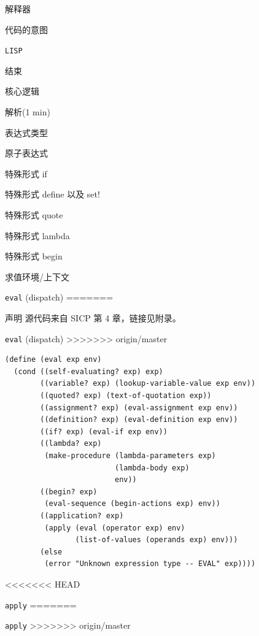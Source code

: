 \documentclass[presentation, bigger]{beamer}
\begin{document}
\begin{frame}[label={sec:org106539d},fragile]{解释器}
\begin{frame}[label={sec:org3020c49},fragile]{代码的意图}
\begin{frame}[label={sec:org3aa0441},fragile]{\texttt{LISP}}
\begin{frame}[label={sec:orgae54002}]{结束}
\begin{frame}[label={sec:orgdceac76}]{核心逻辑}
\begin{frame}[label={sec:org629dbc5},fragile]{解析(1 min)}
\begin{frame}[label={sec:org4dc3947}]{表达式类型}
\begin{frame}[label={sec:org0820679},fragile]{原子表达式}
\begin{frame}[label={sec:org7f2d161},fragile]{特殊形式 \alert{if}}
\begin{frame}[label={sec:org068cbf5},fragile]{特殊形式 \alert{define} 以及 \alert{set!}}
\begin{frame}[label={sec:org112cef9},fragile]{特殊形式 \alert{quote}}
\begin{frame}[label={sec:org11ad90e},fragile]{特殊形式 \alert{lambda}}
\begin{frame}[label={sec:org7715afb},fragile]{特殊形式 \alert{begin}}
\begin{frame}[label={sec:org620347b}]{求值环境/上下文}
\begin{frame}[label={sec:org54f6ddb},fragile]{\texttt{eval} (dispatch)}
=======
\label{sec:org243fb4b}
\begin{frame}[label={sec:orge1c8c53}]{声明}
源代码来自 SICP 第 4 章，链接见附录。
\end{frame}

\begin{frame}[fragile,label={sec:org05cf57d}]{\texttt{eval} (dispatch)}
>>>>>>> origin/master
\begin{lstlisting}
(define (eval exp env)
  (cond ((self-evaluating? exp) exp)
        ((variable? exp) (lookup-variable-value exp env))
        ((quoted? exp) (text-of-quotation exp))
        ((assignment? exp) (eval-assignment exp env))
        ((definition? exp) (eval-definition exp env))
        ((if? exp) (eval-if exp env))
        ((lambda? exp)
         (make-procedure (lambda-parameters exp)
                         (lambda-body exp)
                         env))
        ((begin? exp)
         (eval-sequence (begin-actions exp) env))
        ((application? exp)
         (apply (eval (operator exp) env)
                (list-of-values (operands exp) env)))
        (else
         (error "Unknown expression type -- EVAL" exp))))
\end{lstlisting}
\end{frame}
<<<<<<< HEAD
\begin{frame}[label={sec:org1c939df},fragile]{\texttt{apply}}
=======
\begin{frame}[fragile,label={sec:org5a135bf}]{\texttt{apply}}
>>>>>>> origin/master

\end{frame}
\end{frame}
\end{frame}
\end{frame}
\end{frame}
\end{frame}
\end{frame}
\end{frame}
\end{frame}
\end{frame}
\end{frame}
\end{frame}
\end{frame}
\end{frame}
\end{frame}
\end{frame}
\end{frame}
\end{document}
